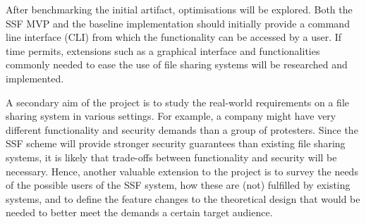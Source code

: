 \documentclass[E]{BAMASA}
\begin{document}
After benchmarking the initial artifact, optimisations will be explored. 
Both the SSF MVP and the baseline implementation should initially provide a command line interface (CLI) from which the functionality can be accessed by a user.
If time permits, extensions such as a graphical interface and functionalities commonly needed to ease the use of file sharing systems will be researched and implemented.

A secondary aim of the project is to study the real-world requirements on a file sharing system in various settings.
For example, a company might have very different functionality and security demands than a group of protesters.
Since the SSF scheme will provide stronger security guarantees than existing file sharing systems, it is likely that trade-offs between functionality and security will be necessary.
Hence, another valuable extension to the project is to survey the needs of the possible users of the SSF system, how these are (not) fulfilled by existing systems, and to define the feature changes to the theoretical design that would be needed to better meet the demands a certain target audience.
\end{document}
